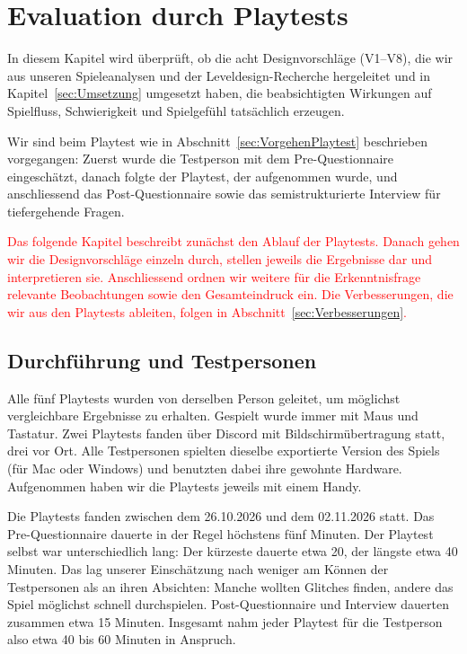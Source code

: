 \documentclass[../Main.tex]{subfiles}
\begin{document}
\section{Evaluation durch Playtests} \label{sec:Evaluation}

In diesem Kapitel wird überprüft, ob die acht Designvorschläge (V1--V8), die wir aus unseren Spieleanalysen und der Leveldesign-Recherche hergeleitet und in Kapitel~\ref{sec:Umsetzung} umgesetzt haben, die beabsichtigten Wirkungen auf Spielfluss, Schwierigkeit und Spielgefühl tatsächlich erzeugen.

Wir sind beim Playtest wie in Abschnitt~\ref{sec:VorgehenPlaytest} beschrieben vorgegangen: Zuerst wurde die Testperson mit dem Pre-Questionnaire eingeschätzt, danach folgte der Playtest, der aufgenommen wurde, und anschliessend das Post-Questionnaire sowie das semistrukturierte Interview für tiefergehende Fragen.

\textcolor{red}{Das folgende Kapitel beschreibt zunächst den Ablauf der Playtests. Danach gehen wir die Designvorschläge einzeln durch, stellen jeweils die Ergebnisse dar und interpretieren sie. Anschliessend ordnen wir weitere für die Erkenntnisfrage relevante Beobachtungen sowie den Gesamteindruck ein. Die Verbesserungen, die wir aus den Playtests ableiten, folgen in Abschnitt~\ref{sec:Verbesserungen}.}

\subsection{Durchführung und Testpersonen} \label{sec:Durchfuehrung}

Alle fünf Playtests wurden von derselben Person geleitet, um möglichst vergleichbare Ergebnisse zu erhalten. Gespielt wurde immer mit Maus und Tastatur. Zwei Playtests fanden über Discord mit Bildschirmübertragung statt, drei vor Ort. Alle Testpersonen spielten dieselbe exportierte Version des Spiels (für Mac oder Windows) und benutzten dabei ihre gewohnte Hardware. Aufgenommen haben wir die Playtests jeweils mit einem Handy.

Die Playtests fanden zwischen dem 26.10.2026 und dem 02.11.2026 statt. Das Pre-Questionnaire dauerte in der Regel höchstens fünf Minuten. Der Playtest selbst war unterschiedlich lang: Der kürzeste dauerte etwa 20, der längste etwa 40 Minuten. Das lag unserer Einschätzung nach weniger am Können der Testpersonen als an ihren Absichten: Manche wollten Glitches finden, andere das Spiel möglichst schnell durchspielen. Post-Questionnaire und Interview dauerten zusammen etwa 15 Minuten. Insgesamt nahm jeder Playtest für die Testperson also etwa 40 bis 60 Minuten in Anspruch.
\end{document}
